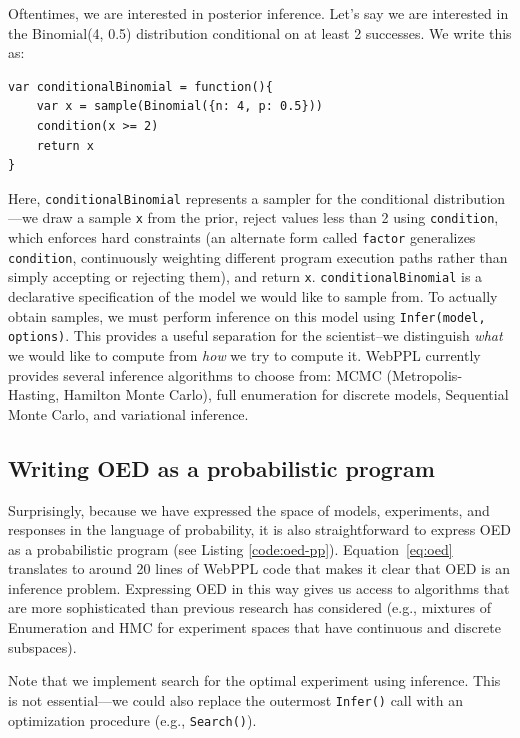 \documentclass{article}
\begin{document}
Oftentimes, we are interested in posterior inference. Let's say we are interested in the Binomial(4, 0.5) distribution conditional on at least 2 successes. We write this as:
%
\begin{lstlisting}[mathescape, label={code:webppl}, caption = {Posterior inference in WebPPL.}]
var conditionalBinomial = function(){
	var x = sample(Binomial({n: 4, p: 0.5}))
	condition(x >= 2)
	return x
}
\end{lstlisting}
Here, \lstinline{conditionalBinomial} represents a sampler for the conditional distribution---we draw a sample \lstinline{x} from the prior, reject values less than 2 using \lstinline{condition}, which enforces hard constraints (an alternate form called \lstinline{factor} generalizes \lstinline{condition}, continuously weighting different program execution paths rather than simply accepting or rejecting them), and return \lstinline{x}.
\lstinline{conditionalBinomial} is a declarative specification of the model we would like to sample from.
To actually obtain samples, we must perform inference on this model using \lstinline{Infer(model, options)}.
This provides a useful separation for the scientist--we distinguish \emph{what} we would like to compute from \emph{how} we try to compute it.
WebPPL currently provides several inference algorithms to choose from: MCMC (Metropolis-Hasting, Hamilton Monte Carlo), full enumeration for discrete models, Sequential Monte Carlo, and variational inference.

\subsection{Writing OED as a probabilistic program}

Surprisingly, because we have expressed the space of models, experiments, and responses in the language of probability, it is also straightforward to express OED as a probabilistic program (see Listing \ref{code:oed-pp}).
Equation~\ref{eq:oed} translates to around 20 lines of WebPPL code that makes it clear that OED is an inference problem.
Expressing OED in this way gives us access to algorithms that are more sophisticated than previous research has considered  (e.g., mixtures of Enumeration and HMC for  experiment spaces that have continuous and discrete subspaces).

Note that we implement search for the optimal experiment using inference.
This is not essential---we could also replace the outermost \lstinline|Infer()| call with an optimization procedure (e.g., \lstinline|Search()|).
\end{document}
